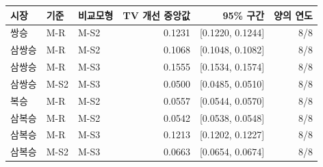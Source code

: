 \begin{tabular}{lllrrr}
\toprule
시장 & 기준 & 비교모형 & TV 개선 중앙값 & 95\% 구간 & 양의 연도 \\
\midrule
쌍승 & M-R & M-S2 & 0.1231 & [0.1220, 0.1244] & 8/8 \\
\addlinespace
삼쌍승 & M-R & M-S2 & 0.1068 & [0.1048, 0.1082] & 8/8 \\
삼쌍승 & M-R & M-S3 & 0.1555 & [0.1534, 0.1574] & 8/8 \\
삼쌍승 & M-S2 & M-S3 & 0.0500 & [0.0485, 0.0510] & 8/8 \\
\addlinespace
복승 & M-R & M-S2 & 0.0557 & [0.0544, 0.0570] & 8/8 \\
\addlinespace
삼복승 & M-R & M-S2 & 0.0542 & [0.0538, 0.0548] & 8/8 \\
삼복승 & M-R & M-S3 & 0.1213 & [0.1202, 0.1227] & 8/8 \\
삼복승 & M-S2 & M-S3 & 0.0663 & [0.0654, 0.0674] & 8/8 \\
\bottomrule
\end{tabular}

